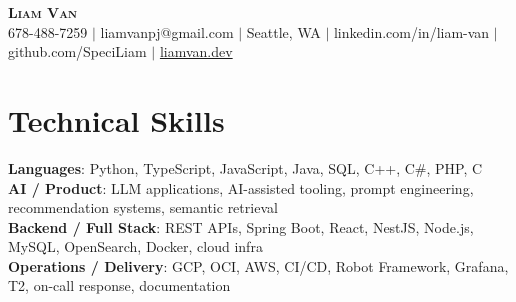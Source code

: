\documentclass[letterpaper,11pt]{article}
\begin{document}

%
\begin{center}
    \textbf{\Huge \scshape Liam Van} \\ \vspace{1pt}
    \small 678-488-7259 $|$ \small {liamvanpj@gmail.com} $|$ Seattle, WA
 {{$|$ linkedin.com/in/liam-van} {$|$ github.com/SpeciLiam} {$|$ \href{https://liamvan.dev}{liamvan.dev}}}

\end{center}

\section{Technical Skills}
 \begin{itemize}[leftmargin=0.15in, label={}]
    \small{\item{
     \textbf{Languages}{: Python, TypeScript, JavaScript, Java, SQL, C++, C\#, PHP, C} \\
     \textbf{AI / Product}{: LLM applications, AI-assisted tooling, prompt engineering, recommendation systems, semantic retrieval} \\
     \textbf{Backend / Full Stack}{: REST APIs, Spring Boot, React, NestJS, Node.js, MySQL, OpenSearch, Docker, cloud infra} \\
     \textbf{Operations / Delivery}{: GCP, OCI, AWS, CI/CD, Robot Framework, Grafana, T2, on-call response, documentation} \\
    }}
 \end{itemize}
%

\end{document}

